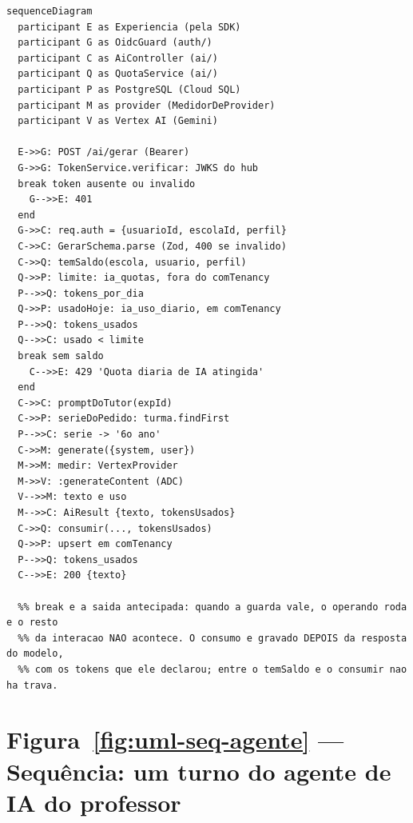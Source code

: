 \begin{lstlisting}[language=mermaid]
sequenceDiagram
  participant E as Experiencia (pela SDK)
  participant G as OidcGuard (auth/)
  participant C as AiController (ai/)
  participant Q as QuotaService (ai/)
  participant P as PostgreSQL (Cloud SQL)
  participant M as provider (MedidorDeProvider)
  participant V as Vertex AI (Gemini)

  E->>G: POST /ai/gerar (Bearer)
  G->>G: TokenService.verificar: JWKS do hub
  break token ausente ou invalido
    G-->>E: 401
  end
  G->>C: req.auth = {usuarioId, escolaId, perfil}
  C->>C: GerarSchema.parse (Zod, 400 se invalido)
  C->>Q: temSaldo(escola, usuario, perfil)
  Q->>P: limite: ia_quotas, fora do comTenancy
  P-->>Q: tokens_por_dia
  Q->>P: usadoHoje: ia_uso_diario, em comTenancy
  P-->>Q: tokens_usados
  Q-->>C: usado < limite
  break sem saldo
    C-->>E: 429 'Quota diaria de IA atingida'
  end
  C->>C: promptDoTutor(expId)
  C->>P: serieDoPedido: turma.findFirst
  P-->>C: serie -> '6o ano'
  C->>M: generate({system, user})
  M->>M: medir: VertexProvider
  M->>V: :generateContent (ADC)
  V-->>M: texto e uso
  M-->>C: AiResult {texto, tokensUsados}
  C->>Q: consumir(..., tokensUsados)
  Q->>P: upsert em comTenancy
  P-->>Q: tokens_usados
  C-->>E: 200 {texto}

  %% break e a saida antecipada: quando a guarda vale, o operando roda e o resto
  %% da interacao NAO acontece. O consumo e gravado DEPOIS da resposta do modelo,
  %% com os tokens que ele declarou; entre o temSaldo e o consumir nao ha trava.
\end{lstlisting}

\section{Figura~\ref{fig:uml-seq-agente} --- Sequência: um turno do agente de IA do professor}

